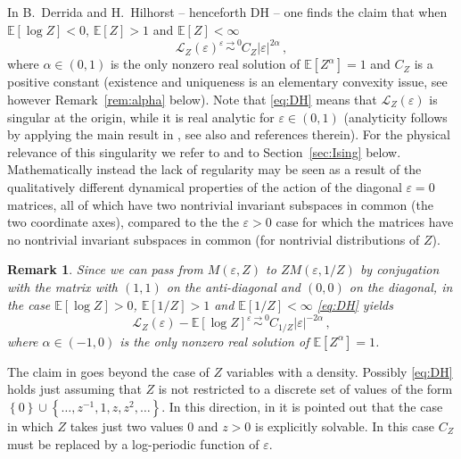 \documentclass[reqno,11pt]{amsart}
\numberwithin{equation}{section}
\newtheorem{rem}[theorem]{Remark}
\newcommand{\cL}{{\ensuremath{\mathcal L}} }
\newcommand{\bbE}{{\ensuremath{\mathbb E}} }
\newcommand{\ga}{\alpha}
\newcommand{\gep}{\varepsilon}       %
\begin{document}
 In \cite{cf:DH}  B.~Derrida and H.~Hilhorst -- henceforth DH --  
one finds the claim that when
$\bbE[ \log Z]< 0$,  $\bbE [Z]>1$ and $\bbE[Z]<\infty$
\begin{equation}
\label{eq:DH}
\cL_Z(\gep)  \stackrel{\gep \to 0}\sim C_Z \vert \gep\vert ^{2 \ga}\, ,
\end{equation}
where $\ga \in (0,1)$  is the only nonzero real solution of $\bbE[Z^\ga]=1$  and $C_Z$ is a positive constant
(existence and uniqueness is an elementary convexity issue, see however
Remark~\ref{rem:alpha} below). Note that \eqref{eq:DH} means that $\cL_Z(\gep)$ is singular at the origin, while it is real analytic for $\gep \in (0,1)$ (analyticity  follows by applying the main result in \cite{cf:Ruelle}, see also  \cite{cf:CGG} and references therein). For the physical relevance of this singularity we refer to \cite{cf:DH} and to Section~\ref{sec:Ising} below. Mathematically 
instead
the lack of regularity may be seen as a result  of the qualitatively different dynamical properties of the action of  the diagonal $\gep=0$ matrices, all of which have two nontrivial invariant subspaces in common (the two coordinate axes), compared to the the $\varepsilon > 0$ case for which the matrices have no nontrivial invariant subspaces in common (for nontrivial distributions of $Z$).

\smallskip

\begin{rem}
\label{rem:alpha<0}
Since we can pass from $M(\varepsilon,Z)$  to $Z M(\varepsilon,1/Z)$ by conjugation with the matrix with $(1,1)$ on the anti-diagonal and $(0,0)$ on the diagonal, in the case   $\bbE[\log Z] > 0 $, $\bbE [1/Z] > 1$ and $\bbE [1/Z] < \infty$ \eqref{eq:DH} yields 
\begin{equation}
\label{eq:DH<}
\cL_Z(\gep) - \bbE[ \log Z] \stackrel{\gep \to 0}\sim C_{1/Z} \vert\gep\vert ^{-2 \ga}\, ,
\end{equation}
where $\ga \in (-1,0)$  is the only nonzero real solution of $\bbE[Z^\ga]=1$.
\end{rem}

\smallskip

The claim in \cite{cf:DH} goes beyond the case of $Z$ variables with a density. Possibly \eqref{eq:DH} holds just assuming that 
$Z$ is not restricted to a discrete set of values of the form $\left\{ 0 \right\} \cup \left\{ \dots,z^{-1},1,z,z^2,\dots \right\}$. In this direction, 
in \cite{cf:DH}  it is pointed out  that the  case in which $Z$ takes just two values $0$ and $z>0$ is explicitly solvable. In this case  $C_Z$ must be replaced by  a log-periodic function of $\gep$. 
\end{document}
